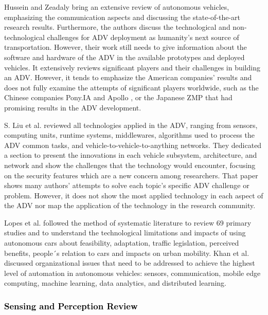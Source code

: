 \documentclass[lettersize,journal]{IEEEtran}
\begin{document}
Hussein and Zeadaly \cite{Hussain2019} bring an extensive review of autonomous vehicles, emphasizing the communication aspects and discussing the state-of-the-art research results. Furthermore, the authors discuss the technological and non-technological challenges for ADV deployment as humanity's next source of transportation. However, their work still needs to give information about the software and hardware of the ADV in the available prototypes and deployed vehicles. It extensively reviews significant players and their challenges in building an ADV. However, it tends to emphasize the American companies' results and does not fully examine the attempts of significant players worldwide, such as the Chinese companies Pony.IA \cite{Pony} and Apollo \cite{Apollo}, or the Japanese ZMP \cite{ZMP} that had promising results in the ADV development.


S. Liu et al. \cite{Liu2019} reviewed all technologies applied in the ADV, ranging from sensors, computing units, runtime systems, middlewares, algorithms used to process the ADV common tasks, and vehicle-to-vehicle-to-anything networks. They dedicated a section to present the innovations in each vehicle subsystem, architecture, and network and show the challenges that the technology would encounter, focusing on the security features which are a new concern among researchers. That paper shows many authors' attempts to solve each topic's specific ADV challenge or problem. However, it does not show the most applied technology in each aspect of the ADV nor map the application of the technology in the research community.


Lopes et al. \cite{10.1145/3466933.3466990} followed the method of systematic literature to review 69 primary studies and to understand the technological limitations and impacts of using autonomous cars about feasibility, adaptation, traffic legislation, perceived benefits, people´s relation to cars and impacts on urban mobility. Khan et al. \cite{10.1145/3485767} discussed organizational issues that need to be addressed to achieve the highest level of automation in autonomous vehicles: sensors, communication, mobile edge computing, machine learning, data analytics, and distributed learning. 

\vspace{1em}

\subsubsection {\textcolor{black}{\textbf{Sensing and Perception Review}}}
\end{document}
